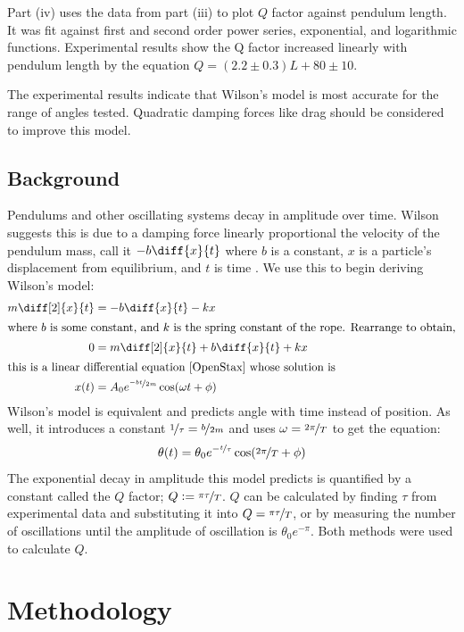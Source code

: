 \documentclass[notitlepage, twocolumn, 12pt]{article}
\begin{document}
    Part (iv) uses the data from part (iii) to plot $Q$ factor against pendulum length. It was fit against first and second order power series, exponential, and logarithmic functions.  Experimental results show the Q factor increased linearly with pendulum length by the equation $Q = (2.2 \pm 0.3)L + 80 \pm 10$. 
    
    The experimental results indicate that Wilson's model is most accurate for the range of angles tested. Quadratic damping forces like drag should be considered to improve this model. 

    \subsection*{Background}
    Pendulums and other oscillating systems decay in amplitude over time. Wilson suggests this is due to a damping force linearly proportional the velocity of the pendulum mass, call it $-b\diff{x}{t}$ where $b$ is a constant, $x$ is a particle's displacement from equilibrium, and $t$ is time \cite{OpenStax}. We use this to begin deriving Wilson's model:
    \begin{align*}
        m \diff[2]{x}{t} &= - b \diff{x}{t} - kx \\
        \intertext{where $b$ is some constant, and $k$ is the spring constant of the rope. Rearrange to obtain,}
        0 &= m \diff[2]{x}{t} + b \diff{x}{t} + kx   \\
    \intertext{this is a linear differential equation \cite{OpenStax} whose solution is} 
        x(t) &= A_0e^{\nicefrac{-bt}{2m}}\cos(\omega t + \phi)
    \end{align*} 
    Wilson's model is equivalent and predicts angle with time instead of position. As well, it introduces a constant $\nicefrac{1}{\tau} = \nicefrac{b}{2m}$ and uses $\omega = \nicefrac{2 \pi}{T}$ to get the equation:
    \begin{equation}\label{eq:1}
        \theta(t) = \theta_0 e^{-\nicefrac{t}{\tau}}\cos(\nicefrac{2\pi}{T} + \phi)
    \end{equation}
    The exponential decay in amplitude this model predicts is quantified by a constant called the $Q$ factor;  $Q \vcentcolon= \nicefrac{\pi \tau}{T}$. $Q$ can be calculated by finding $\tau$ from experimental data and substituting it into $Q = \nicefrac{\pi \tau}{T}$, or by measuring the number of oscillations until the amplitude of oscillation is $\theta_0e^{-\pi}$. Both methods were used to calculate $Q$. 
    
    \section*{Methodology} \label{method}
\end{document}
